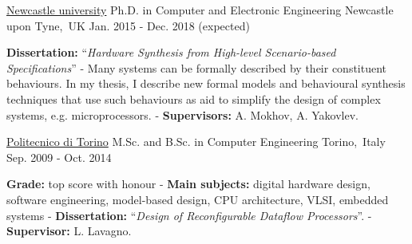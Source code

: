 
\begin{cventries}


\cventry
{\href{https://www.ncl.ac.uk/}{\color{myblue}Newcastle university}} %
{Ph.D. in Computer and Electronic Engineering} %
{Newcastle upon Tyne,~UK} %
{Jan. 2015 - Dec. 2018 (expected)} %
{ %
\begin{cvitems}
\textbf{Dissertation:} ``\textit{Hardware Synthesis from High-level 
Scenario-based Specifications}'' - Many systems can be formally described 
by their constituent behaviours. In my thesis, I describe new formal models and 
behavioural synthesis techniques that use such behaviours as aid to 
simplify the design of complex systems, e.g. microprocessors. - 
\textbf{Supervisors:} A. Mokhov, A. Yakovlev.
\end{cvitems}
}


\cventry
{\href{https://www.polito.it/?lang=en}{\color{myblue}Politecnico di Torino}}
{M.Sc. and B.Sc. in Computer Engineering}
{Torino,~Italy}
{Sep. 2009 - Oct. 2014}
{
\begin{cvitems}
\textbf{Grade:} top score with honour - \textbf{Main subjects:} 
digital hardware design, software engineering, model-based design, CPU 
architecture, VLSI, embedded systems - \textbf{Dissertation:} ``\emph{Design of 
Reconfigurable Dataflow Processors}''. - \textbf{Supervisor:} L. Lavagno.
\end{cvitems}
}


\end{cventries}
\vspace{-1mm}